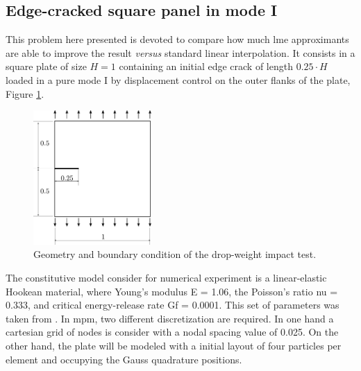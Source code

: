 \documentclass[preprint,12pt,a4paper]{elsarticle}
\begin{document}
\subsection{Edge-cracked square panel in mode I}
\label{sec:3.1}

This problem here presented is devoted to compare how much \acrshort{lme}
approximants are able to improve the result \textit{versus} standard
linear interpolation. It consists in a square plate of size $H = 1$ containing
an initial edge crack of length $0.25 \cdot H$ loaded in a pure mode I
by displacement control on the outer flanks of the plate, Figure
\ref{fig:geometry-cracked-panel-mode-I}.
\begin{figure}
  \centering
  \includegraphics[width=0.4\textwidth]{Figure-Mode_I}
  \caption{Geometry and boundary condition of the drop-weight impact test.}
  \label{fig:geometry-cracked-panel-mode-I}
\end{figure}
The constitutive model consider for numerical experiment is a
linear-elastic Hookean material, where Young's modulus \gls{E} = 1.06, the
Poisson's ratio \gls{nu} = 0.333, and critical energy-release rate
\gls{Gf} = 0.0001. This set of parameters was taken from \cite{Pandolfi_2012}. In
\acrshort{mpm}, two different discretization are required. In one hand
a cartesian grid of nodes is consider with a nodal spacing value of
0.025. On the other hand, the plate will be modeled with a initial
layout of four particles per element and occupying the Gauss quadrature
positions.\\
\end{document}
